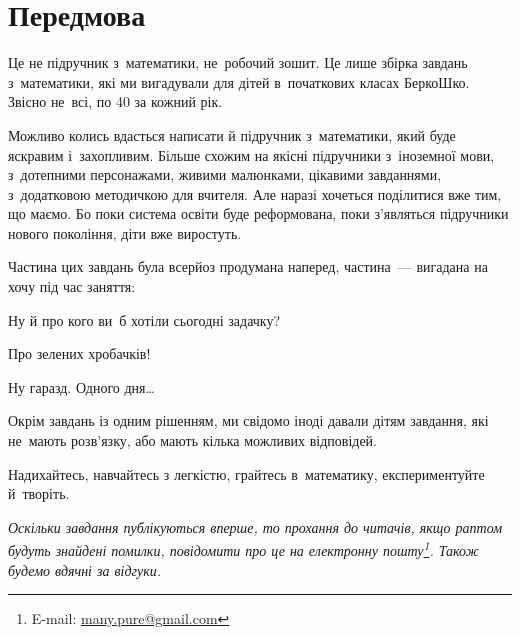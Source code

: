 \chapter*{Передмова}

Це не підручник з~математики, не~робочий зошит.
Це лише збірка завдань з~математики, які ми вигадували для дітей
в~початкових класах БеркоШко.
Звісно не~всі, по 40 за кожний рік.

Можливо колись вдасться написати й підручник з~математики,
який буде яскравим і~захопливим.
Більше схожим на якісні підручники з~іноземної мови, з~дотепними персонажами,
живими малюнками, цікавими завданнями, з~додатковою методичкою для вчителя.
Але наразі хочеться поділитися вже тим, що маємо.
Бо поки система освіти буде реформована, поки з’являться підручники
нового покоління, діти вже виростуть.

Частина цих завдань була всерйоз продумана наперед,
частина~--- вигадана на хочу під час заняття:
\begin{dialogue}
    \item Ну й про кого ви~б хотіли сьогодні задачку?
    \item Про зелених хробачків!
    \item Ну гаразд. Одного дня\ldots
\end{dialogue}

Окрім завдань із одним рішенням, ми свідомо іноді давали дітям завдання,
які не~мають розв’язку, або мають кілька можливих відповідей.

Надихайтесь, навчайтесь з легкістю, грайтесь в~математику,
експериментуйте й~творіть. \smiley

\medskip
\medskip

\emph{\small
Оскільки завдання публікуються вперше, то прохання до читачів,
якщо раптом будуть знайдені помилки,
повідомити про це на електронну пошту\footnote{
    E-mail: \href{mailto:many.pure@gmail.com}{many.pure@gmail.com}
}. Також будемо вдячні за відгуки.
}%
\smiley
